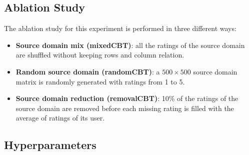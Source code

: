 \subsection{Ablation Study}

The ablation study for this experiment is performed in three different ways:
\begin{itemize}
\item \textbf{Source domain mix (mixedCBT)}: all the ratings of the source domain are shuffled without keeping rows and column relation.
\item \textbf{Random source domain (randomCBT)}: a $500 \times 500$ source domain matrix is randomly generated with ratings from 1 to 5.
\item \textbf{Source domain reduction (removalCBT)}: 10\% of the ratings of the source domain are removed before each missing rating is filled with the average of ratings of its user.
\end{itemize}


\subsection{Hyperparameters}

